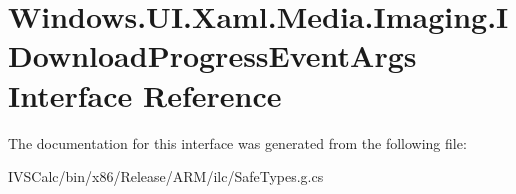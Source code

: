 \hypertarget{interface_windows_1_1_u_i_1_1_xaml_1_1_media_1_1_imaging_1_1_i_download_progress_event_args}{}\section{Windows.\+U\+I.\+Xaml.\+Media.\+Imaging.\+I\+Download\+Progress\+Event\+Args Interface Reference}
\label{interface_windows_1_1_u_i_1_1_xaml_1_1_media_1_1_imaging_1_1_i_download_progress_event_args}


The documentation for this interface was generated from the following file\+:\begin{DoxyCompactItemize}
\item 
I\+V\+S\+Calc/bin/x86/\+Release/\+A\+R\+M/ilc/Safe\+Types.\+g.\+cs\end{DoxyCompactItemize}
